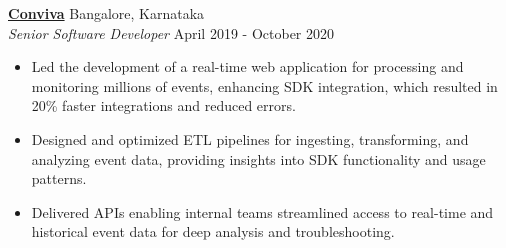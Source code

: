\textbf{\href{https://www.conviva.com/}{Conviva}} \hfill Bangalore, Karnataka\\
\textit{Senior Software Developer} \hfill April 2019 - October 2020
\begin{itemize}[leftmargin=*]
  \itemsep0em
  \item Led the development of a real-time web application for processing and monitoring millions of events, enhancing SDK integration, which resulted in 20\% faster integrations and reduced errors.
  \item Designed and optimized ETL pipelines for ingesting, transforming, and analyzing event
    data, providing insights into SDK functionality and usage patterns.
  \item Delivered APIs enabling internal teams streamlined access to real-time and historical event data for deep analysis and troubleshooting.
\end{itemize}
